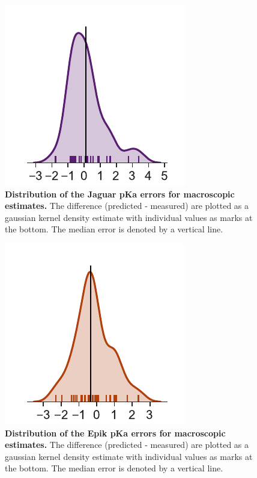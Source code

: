 \documentclass[9pt,lineno,final]{elife}
\begin{document}
\begin{figure}
 \centering
 \includegraphics{Reports/Experiment-Jaguar-Macro-align-distribution.pdf}
 \caption{{\bf Distribution of the Jaguar pKa errors for macroscopic estimates.} The difference (predicted - measured) are plotted as a gaussian kernel density estimate with individual values as marks at the bottom. The median error is denoted by a vertical line.}
\end{figure}

\begin{figure}
 \centering
 \includegraphics{Reports/Experiment-Epik-Macro-align-distribution.pdf}
 \caption{{\bf Distribution of the Epik pKa errors for macroscopic estimates.} The difference (predicted - measured) are plotted as a gaussian kernel density estimate with individual values as marks at the bottom. The median error is denoted by a vertical line.}
\end{figure}
\end{document}

